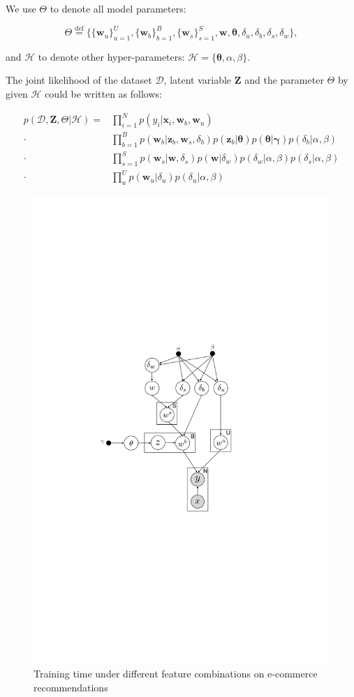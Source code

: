 We use $\Theta$ to denote all model parameters:

\begin{equation}
\Theta \overset{\mathrm{def}}= \Big\{\{\bm{w}_u\}_{u=1}^U, \{\bm{w}_b\}_{b=1}^B, \{\bm{w}_s\}_{s=1}^S, \bm{w}, \bm{\theta}, \delta_u,\delta_b,\delta_s,\delta_w \Big\},
\end{equation}

\noindent and $\mathcal{H}$ to denote other hyper-parameters: $\mathcal{H} = \{\bm{\theta}, \alpha,\beta\}$.


The joint likelihood of the dataset $\mathcal{D}$, latent variable $\bm{Z}$ and the parameter $\Theta$ by given $\mathcal{H}$ could be written as follows:

\begin{align}
  p(\mathcal{D},\bm{Z},\Theta|\mathcal{H})= & \prod_{i=1}^N p(y_i|\bm{x}_i,\bm{w}_b,\bm{w}_u)  \\ 
  \cdot &  \prod_{b=1}^B p(\bm{w}_b|\bm{z}_b,\bm{w}_s,\delta_b) p(\bm{z}_{b}|\bm{\theta}) p(\bm{\theta}|\bm{\gamma}) p(\delta_b|\alpha,\beta) \\
  \cdot & \prod_{s=1}^S p(\bm{w}_s|\bm{w},\delta_s) p(\bm{w}|\delta_w)p(\delta_w|\alpha,\beta) p(\delta_s|\alpha,\beta) \\
   \cdot & \prod_{u}^U p(\bm{w}_u|\delta_u) p(\delta_u|\alpha,\beta) 
\label{joint_p}
\end{align}


\begin{figure}[htb]
\includegraphics[width=0.8\linewidth]{fig/model}
\caption{Training time under different feature combinations on e-commerce recommendations}
\label{fig:train_time_cmp}
\end{figure}

